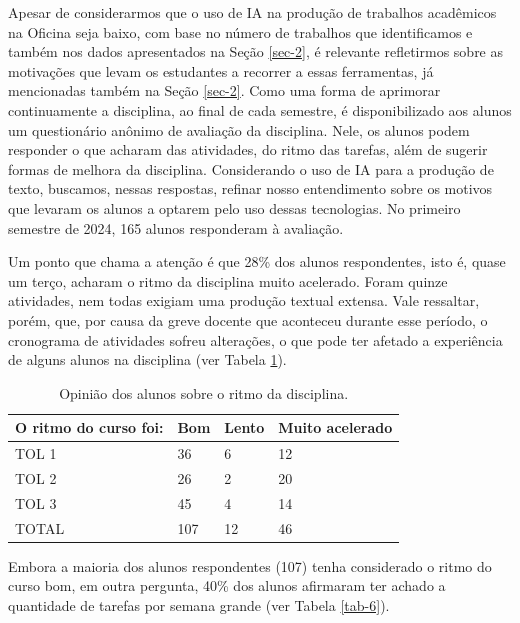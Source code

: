 \documentclass[portuguese]{textolivre}
\begin{document}
Apesar de considerarmos que o uso de IA na produção de trabalhos acadêmicos na Oficina seja baixo, com base no número de trabalhos que identificamos e também nos dados apresentados na Seção \ref{sec-2}, é relevante refletirmos sobre as motivações que levam os estudantes a recorrer a essas ferramentas, já mencionadas também na Seção \ref{sec-2}. Como uma forma de aprimorar continuamente a disciplina, ao final de cada semestre, é disponibilizado aos alunos um questionário anônimo de avaliação da disciplina. Nele, os alunos podem responder o que acharam das atividades, do ritmo das tarefas, além de sugerir formas de melhora da disciplina. Considerando o uso de IA para a produção de texto, buscamos, nessas respostas, refinar nosso entendimento sobre os motivos que levaram os alunos a optarem pelo uso dessas tecnologias. No primeiro semestre de 2024, 165 alunos responderam à avaliação.

Um ponto que chama a atenção é que 28\% dos alunos respondentes, isto é, quase um terço, acharam o ritmo da disciplina muito acelerado. Foram quinze atividades, nem todas exigiam uma produção textual extensa. Vale ressaltar, porém, que, por causa da greve docente que aconteceu durante esse período, o cronograma de atividades sofreu alterações, o que pode ter afetado a experiência de alguns alunos na disciplina (ver Tabela \ref{tab-5}).
\newpage
\begin{table}[h!]
\centering
\begin{threeparttable}
\caption{Opinião dos alunos sobre o ritmo da disciplina.}\label{tab-5}
\begin{tabular}{llll}
\toprule
O ritmo do curso foi: & Bom & Lento & Muito acelerado \\
\midrule
TOL 1 & 36 & 6 & 12 \\
TOL 2 & 26 & 2 & 20 \\
TOL 3 & 45 & 4 & 14 \\
TOTAL & 107 & 12 & 46 \\
\bottomrule
\end{tabular}
\end{threeparttable}
\end{table}

Embora a maioria dos alunos respondentes (107) tenha considerado o ritmo do curso bom, em outra pergunta, 40\% dos alunos afirmaram ter achado a quantidade de tarefas por semana grande (ver Tabela \ref{tab-6}).
\end{document}

